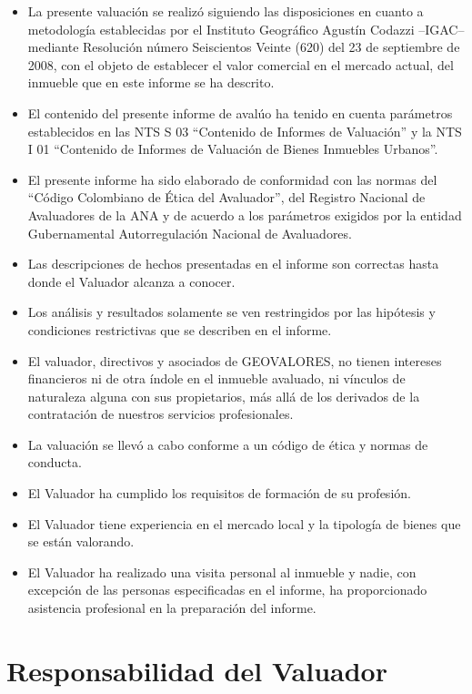\documentclass[12pt,a4paper,twoside]{article}
\begin{document}
\begin{itemize}
	\item La presente valuación se realizó siguiendo las disposiciones en cuanto a metodología establecidas por el Instituto Geográfico Agustín Codazzi –IGAC– mediante Resolución número Seiscientos Veinte (620) del 23 de septiembre de 2008, con el objeto de establecer el valor comercial en el mercado actual, del inmueble que en este informe se ha descrito.
	\item El contenido del presente informe de avalúo ha tenido en cuenta parámetros establecidos en las NTS S 03 “Contenido de Informes de Valuación” y la NTS I 01 “Contenido de Informes de Valuación de Bienes Inmuebles Urbanos”.
	\item El presente informe ha sido elaborado de conformidad con las normas del “Código Colombiano de Ética del Avaluador”, del Registro Nacional de Avaluadores de la ANA y de acuerdo a los parámetros exigidos por la entidad Gubernamental Autorregulación Nacional de Avaluadores.
	\item Las descripciones de hechos presentadas en el informe son correctas hasta donde el Valuador alcanza a conocer.
	\item Los análisis y resultados solamente se ven restringidos por las hipótesis y condiciones restrictivas que se describen en el informe.
	\item El valuador, directivos y asociados de GEOVALORES, no tienen intereses financieros ni de otra índole en el inmueble avaluado, ni vínculos de naturaleza alguna con sus propietarios, más allá de los derivados de la contratación de nuestros servicios profesionales.
	\item La valuación se llevó a cabo conforme a un código de ética y normas de conducta.
	\item El Valuador ha cumplido los requisitos de formación de su profesión.
	\item El Valuador tiene experiencia en el mercado local y la tipología de bienes que se están valorando.
	\item El Valuador ha realizado una visita personal al inmueble y nadie, con excepción de las personas especificadas en el informe, ha proporcionado asistencia profesional en la preparación del informe.
	
\end{itemize}

\section{Responsabilidad del Valuador}
\end{document}
